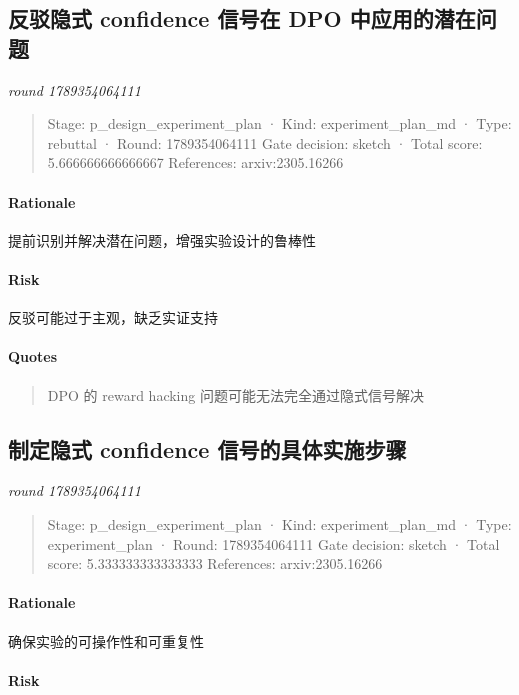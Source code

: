 \documentclass{article}
\begin{document}
\subsection{反驳隐式 confidence 信号在 DPO 中应用的潜在问题}
\textit{round 1789354064111}\\
\begin{quote}
Stage: p\_design\_experiment\_plan  ·  Kind: experiment\_plan\_md  ·  Type: rebuttal  ·  Round: 1789354064111
Gate decision: sketch  ·  Total score: 5.666666666666667
References: arxiv:2305.16266
\end{quote}

\paragraph{Rationale}

提前识别并解决潜在问题，增强实验设计的鲁棒性

\paragraph{Risk}

反驳可能过于主观，缺乏实证支持

\paragraph{Quotes}
\begin{quote}
DPO 的 reward hacking 问题可能无法完全通过隐式信号解决
\end{quote}

\subsection{制定隐式 confidence 信号的具体实施步骤}
\textit{round 1789354064111}\\
\begin{quote}
Stage: p\_design\_experiment\_plan  ·  Kind: experiment\_plan\_md  ·  Type: experiment\_plan  ·  Round: 1789354064111
Gate decision: sketch  ·  Total score: 5.333333333333333
References: arxiv:2305.16266
\end{quote}

\paragraph{Rationale}

确保实验的可操作性和可重复性

\paragraph{Risk}
\end{document}
